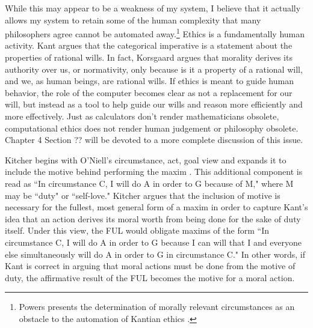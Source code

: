 \begin{isabellebody}
\begin{isamarkuptext}
While this may appear to be a weakness of my system, I believe that it actually
allows my system to retain some of the human complexity that many philosophers agree cannot be automated away.\footnote{Powers presents 
the determination of morally relevant circumstances as an obstacle to the automation of Kantian ethics \cite{powers}.}
Ethics is a fundamentally human activity. Kant argues that the categorical imperative is a statement 
about the properties of rational wills. In fact, Korsgaard argues that morality derives its authority over us, 
or normativity, only because is it a property of a rational will, and we, as human beings, are rational wills.
If ethics is meant to guide human behavior, the role of the computer becomes clear as not a replacement for our will,
but instead as a tool to help guide our wills and reason more efficiently 
and more effectively. Just as calculators don't render mathematicians obsolete, computational ethics
does not render human judgement or philosophy obsolete. Chapter 4 Section ?? will be devoted to a more complete discussion 
of this issue.%
\end{isamarkuptext}\isamarkuptrue%
%
\isadelimdocument
%
\endisadelimdocument
%
\isatagdocument
%
\isamarkuptrue%
%
\endisatagdocument
{\isafolddocument}%
%
\isadelimdocument
%
\endisadelimdocument
%
\begin{isamarkuptext}%
Kitcher begins with O'Niell's circumstance, act, goal view and expands it to include the motive 
behind performing the maxim \cite{whatisamaxim}. This additional component is read 
as ``In circumstance C, I will do A in order to G because of M," where M may be ``duty" or ``self-love."
Kitcher argues that the inclusion of motive is necessary for the fullest, most general form of a maxim
in order to capture Kant's idea that an action derives its moral worth from being done for the sake of duty itself.
Under this view, the FUL would obligate maxims of the form 
``In circumstance C, I will do A in order to G because I can will that I and everyone else simultaneously
will do A in order to G in circumstance C." In other words, if Kant is correct in arguing that moral 
actions must be done from the motive of duty, the affirmative result of the FUL becomes 
the motive for a moral action.


\end{isamarkuptext}
\end{isabellebody}
